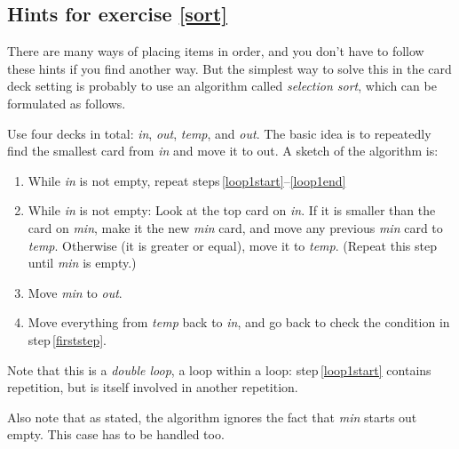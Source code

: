 \documentclass[a4paper,twoside]{tufte-handout}
\begin{document}
 \subsection{Hints for exercise \ref{sort}}\label{sec-hints}
 
 There are many ways of placing items in order, and you don't have to
 follow these hints if you find another way. But the simplest way to
 solve this in the card deck setting is probably to use an algorithm
 called \emph{selection sort}, which can be formulated as follows.

 Use four decks in total: \emph{in}, \emph{out}, \emph{temp}, and
 \emph{out}. The basic idea is to repeatedly find the smallest card
 from \emph{in} and move it to out. A sketch of the algorithm is:

\begin{enumerate}
\item\label{firststep} While \emph{in} is not empty, repeat steps\,\ref{loop1start}--\ref{loop1end} \\
\item\label{loop1start} While \emph{in} is not empty:
  Look at the top card on \emph{in}. If it is smaller than the card on
  \emph{min}, make it the new \emph{min} card, and move any
  previous \emph{min} card to \emph{temp}. Otherwise (it is greater or
  equal), move it to \emph{temp}. (Repeat this step until \emph{min}
  is empty.)
\item Move \emph{min} to \emph{out}.
\item\label{loop1end} Move everything from \emph{temp} back to
  \emph{in}, and go back to check the condition in step\,\ref{firststep}.
\end{enumerate}

Note that this is a \emph{double loop}, a loop within a loop:
step\,\ref{loop1start} contains repetition, but is itself involved in
another repetition.

Also note that as stated, the algorithm ignores the fact that
\emph{min} starts out empty. This case has to be handled too.
\end{document}
